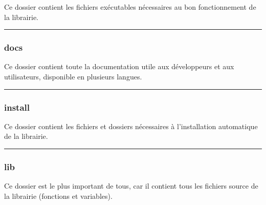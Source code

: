 \documentclass[a4paper,10pt]{article}
\begin{document}
    \begin{justify}
        Ce dossier contient les fichiers exécutables nécessaires au bon fonctionnement de la librairie.
    \end{justify}



    \color{sec3}\par\noindent\rule{\textwidth}{0.4pt}\color{text}

    \color{sec3}
    \subsubsection{docs}\color{text}

    \begin{justify}
        Ce dossier contient toute la documentation utile aux développeurs et aux utilisateurs, disponible en plusieurs langues.
    \end{justify}



    \color{sec3}\par\noindent\rule{\textwidth}{0.4pt}\color{text}

    \color{sec3}
    \subsubsection{install}\color{text}

    \begin{justify}
        Ce dossier contient les fichiers et dossiers nécessaires à l'installation automatique de la librairie.
    \end{justify}



    \color{sec3}\par\noindent\rule{\textwidth}{0.4pt}\color{text}

    \color{sec3}
    \subsubsection{lib}\color{text}

    \begin{justify}
        Ce dossier est le plus important de tous, car il contient tous les fichiers source de la librairie (fonctions et variables).
    \end{justify}
\end{document}
